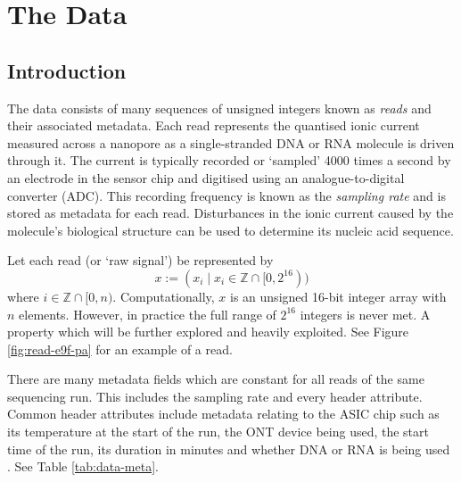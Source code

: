 \chapter{The Data} \label{chap:data}

\section{Introduction}




The data consists of many sequences of unsigned integers known as \textit{reads} and their associated metadata. Each read represents the quantised ionic current measured across a nanopore as a single-stranded DNA or RNA molecule is driven through it. The current is typically recorded or `sampled' 4000 times a second by an electrode in the sensor chip and digitised using an analogue-to-digital converter (ADC). This recording frequency is known as the \textit{sampling rate} and is stored as metadata for each read. Disturbances in the ionic current caused by the molecule's biological structure can be used to determine its nucleic acid sequence.

Let each read (or `raw signal') be represented by
\[ x := (x_i\mid x_i \in \mathbb{Z} \cap [0, 2^{16})) \]
where $i\in \mathbb{Z}\cap [0, n)$. Computationally, $x$ is an unsigned 16-bit integer array with $n$ elements. However, in practice the full range of $2^{16}$ integers is never met. A property which will be further explored and heavily exploited. See Figure \ref{fig:read-e9f-pa} for an example of a read.

There are many metadata fields which are constant for all reads of the same sequencing run. This includes the sampling rate and every header attribute. Common header attributes include metadata relating to the ASIC chip such as its temperature at the start of the run, the ONT device being used, the start time of the run, its duration in minutes and whether DNA or RNA is being used \cite{slow5-spec}. See Table \ref{tab:data-meta}.




